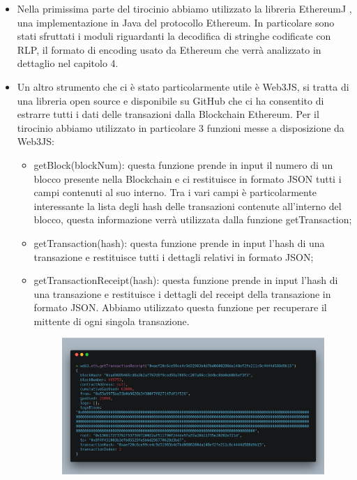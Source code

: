 \documentclass[12pt]{report}
\begin{document}
\begin{itemize}
    \item Nella primissima parte del tirocinio abbiamo utilizzato la libreria EthereumJ \cite{EthereumJ}, una implementazione in Java del protocollo Ethereum. In particolare sono stati sfruttati i moduli riguardanti la decodifica di stringhe codificate con RLP, il formato di encoding usato da Ethereum che verrà analizzato in dettaglio nel capitolo 4.
    \item Un altro strumento che ci è stato particolarmente utile è Web3JS, si tratta di una libreria open source e disponibile su GitHub \cite{Web3JS} che ci ha consentito di estrarre tutti i dati delle transazioni dalla Blockchain Ethereum.\newline
    Per il tirocinio abbiamo utilizzato in particolare 3 funzioni messe a disposizione da Web3JS:
        \begin{itemize}
            \item getBlock(blockNum): questa funzione prende in input il numero di un blocco presente nella Blockchain e ci restituisce in formato JSON tutti i campi contenuti al suo interno. Tra i vari campi è particolarmente interessante la lista degli hash delle transazioni contenute all'interno del blocco, questa informazione verrà utilizzata dalla funzione getTransaction;
            \item getTransaction(hash): questa funzione prende in input l'hash di una transazione e restituisce tutti i dettagli relativi in formato JSON;
            \item getTransactionReceipt(hash): questa funzione prende in input l'hash di una transazione e restituisce i dettagli del receipt della transazione in formato JSON. Abbiamo utilizzato questa funzione per recuperare il mittente di ogni singola transazione.
            \begin{figure}[H]
                \includegraphics[width=\textwidth]{carbon-10}

\end{figure}
\end{itemize}
\end{itemize}
\end{document}
